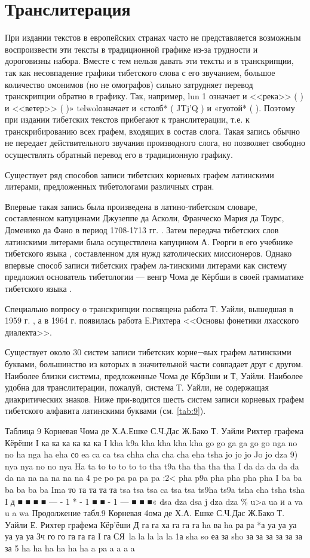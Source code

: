 {\section{Транслитерация}

При издании текстов в европейских странах часто не представляется возможным воспроизвести эти тексты в традиционной графике из-за трудности и дороговизны набора. Вместе с тем нельзя давать эти тексты и в транскрипции, так как несовпадение графики тибетского слова с его звучанием, большое количество омонимов (но не омографов) сильно затрудняет перевод транскрипции обратно в графику. Так, например, lun 1 означает и <<река>> (	) и <<ветер>> (	)» telwolозначает и «столб* ( JTj'Q ) и «гуотой* (	). Поэтому при издании тибетских текстов прибегают к транслитерации, т.е. к транскрибированию всех графем, входящих в состав слога. Такая запись обычно не передает действительного звучания производного слога, но позволяет свободно осуществлять обратный перевод его в традиционную графику.

Существует ряд способов записи тибетских корневых графем латинскими литерами, предложенных тибетологами различных стран.

Впервые такая запись была произведена в латино-тибетском словаре, составленном капуцинами Джузеппе да Асколи, Франческо Мария да Тоурс, Доменико да Фано в период 1708-1713 гг. .
Затем передача тибетских слов латинскими литерами была осуществлена капуцином А. Георги в его учебнике тибетского языка   , составленном для нужд католических миссионеров.
Однако впервые способ записи тибетских графем ла-тинскими литерами как систему предложил основатель тибетологии — венгр Чома де Кёрбши в своей грамматике тибетского языка .

Специально вопросу о транскрипции посвящена работа Т. Уайли, вышедшая в 1959 г. , а в 1964 г. появилась работа Е.Рихтера <<Основы фонетики лхасского диалекта>>.

Существует около 30 систем записи тибетских корне¬вых графем латинскими буквами, большинство из которых в значительной части совпадает друг с другом. Наиболее близки системы, предложенные Чома де КбрЗши и Т, Уайли. Наиболее удобна для транслитерации, пожалуй, система Т. Уайли, не содержащая диакритических знаков. Ниже при-водится шесть систем записи корневых графем тибетского алфавита латинскими буквами (см. \ref{tab:9}).

Таблица 9
Корневая Чома де Х.А.Ешке С.Ч.Дас Ж.Бако Т. Уайли Рихтер графема Кёрёши
I	ка	 ка	ка	ка	ка	ка
 	I	kha	k9a	kha	kha	kha	kha
	go	go	ga	ga	go	go
nga	no	no	ha	nga	ha
 	eha	со	ea	ca	ca	tsa
chha cha	cha cha	eha tsha
jo	jo	jo	Jo	jo	dza
9)	nya	nya	no	no	nya	Ha
 	ta	to	to	to	to	to
 	tha	t9a	tha	tha	tha	tha
I da	da	da	da	da	da
 	na	na	na	na	na	na
 4	pe	po	pa	pa	pa	pa
:2<	pha	p9a	pha	pha	pha	pha
 	I ba	ba	ba	ba	ba	ba
Ima	то	та	та	та	та
tsa	tsa	tsa	ca	tsa	tsa
 	ts9ha	ts9a	tsha	cha	tsha	tsha
		I		  д	■ ■ ■	■ —	- 1	*	-	1	■ ■	- 1	— ■	■ ■«
 	dsa	dza	dsa	j	dza	dza
\%	u>a	ua	и a	va	u a	wa
Продолжение табл.9
Корневая 4ома де Х.А. Ешке С.Ч.Дас Ж.Бако Т. Уайли Е. Рихтер графема	Кёр'ёши
Д	га	га	ха	га	га	га
ha	ва	ha	ра	ра	*а
уа	уа	уа	уа	уа	уа
Зч го	го	 га  га  га I га	
СЯ\	la	la	la	la	la	1а
 	sha	so	еа	за	sho	за
за	за	за	за	за	за
5	ha	ha	ha	ha	ha	ha
a	pa	a	a	a	a

}
